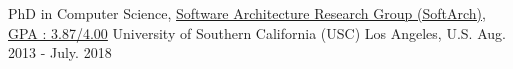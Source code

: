 

\begin{cventries}

  \cventry
    {PhD in Computer Science, \href{http://softarch.usc.edu/} {Software Architecture Research Group (SoftArch), GPA : 3.87/4.00}} %
    {University of Southern California (USC)} %
    {Los Angeles, U.S.} %
	{Aug. 2013 - July. 2018} %
    {
    }
  \vspace{-5mm}
    

\end{cventries}
